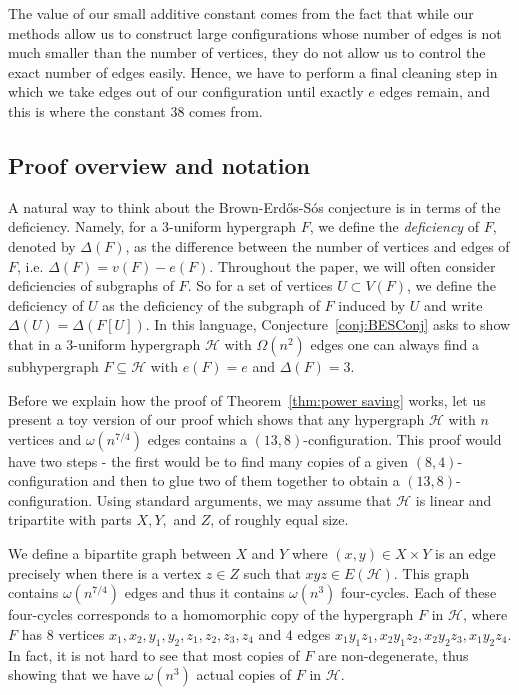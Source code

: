 \documentclass{daj}
\def\cH{\mathcal{H}}
\theoremstyle{plain}
\theoremstyle{remark}
\begin{document}
The value of our small additive constant comes from the fact that while our methods allow us to construct large configurations whose number of edges is not much smaller than the number of vertices, they do not allow us to control the exact number of edges easily. Hence, we have to perform a final cleaning step in which we take edges out of our configuration until exactly $e$ edges remain, and this is where the constant $38$ comes from. 

\subsection{Proof overview and notation}

A natural way to think about the Brown-Erd\H{o}s-S\'os conjecture is in terms of the deficiency. Namely, for a 3-uniform hypergraph $F$, we define the \textit{deficiency} of $F$, denoted by $\Delta(F)$, as the difference between the number of vertices and edges of $F$, i.e. $\Delta(F)=v(F)-e(F)$. Throughout the paper, we will often consider deficiencies of subgraphs of $F$. So for a set of vertices $U\subset V(F)$, we define the deficiency of $U$ as the deficiency of the subgraph of $F$ induced by $U$ and write $\Delta(U)=\Delta(F[U])$. In this language, Conjecture~\ref{conj:BESConj} asks to show that in a 3-uniform hypergraph $\cH$ with $\Omega(n^2)$ edges one can always find a subhypergraph $F\subseteq \cH$ with $e(F)=e$ and $\Delta(F)=3$.

Before we explain how the proof of Theorem~\ref{thm:power saving} works, let us present a toy version of our proof which shows that any hypergraph $\cH$ with $n$ vertices and $\omega(n^{7/4})$ edges contains a $(13, 8)$-configuration. This proof would have two steps - the first would be to find many copies of a given $(8, 4)$-configuration and then to glue two of them together to obtain a $(13, 8)$-configuration. Using standard arguments, we may assume that $\cH$ is linear and tripartite with parts $X, Y,$ and $Z$, of roughly equal size.

We define a bipartite graph between $X$ and $Y$ where $(x, y)\in X\times Y$ is an edge precisely when there is a vertex $z\in Z$ such that $xyz\in E(\cH)$. This graph contains $\omega(n^{7/4})$ edges and thus it contains $\omega(n^3)$ four-cycles. Each of these four-cycles corresponds to a homomorphic copy of the hypergraph $F$ in $\cH$, where $F$ has $8$ vertices $x_1, x_2, y_1, y_2, z_1, z_2, z_3, z_4$ and $4$ edges $x_1y_1z_1, x_2y_1z_2, x_2y_2z_3, x_1y_2z_4$. In fact, it is not hard to see that most copies of $F$ are non-degenerate, thus showing that we have $\omega(n^3)$ actual copies of $F$ in $\cH$. 
\end{document}
